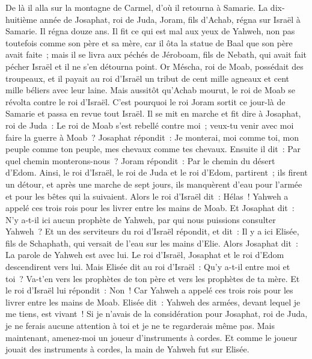 \begin{multicols}{2}
De là il alla sur la montagne de Carmel, d'où il retourna à Samarie.
\VerseOne{}La dix-huitième année de Josaphat, roi de Juda, Joram, fils d'Achab, régna sur Israël à Samarie. Il régna douze ans.
Il fit ce qui est mal aux yeux de Yahweh, non pas toutefois comme son père et sa mère, car il ôta la statue de Baal que son père avait faite~;
mais il se livra aux péchés de Jéroboam, fils de Nebath, qui avait fait pécher Israël et il ne s'en détourna point.
Or Méscha, roi de Moab, possédait des troupeaux, et il payait au roi d'Israël un tribut de cent mille agneaux et cent mille béliers avec leur laine.
Mais aussitôt qu'Achab mourut, le roi de Moab se révolta contre le roi d'Israël.
C'est pourquoi le roi Joram sortit ce jour-là de Samarie et passa en revue tout Israël.
Il se mit en marche et fit dire à Josaphat, roi de Juda~: Le roi de Moab s'est rebellé contre moi~; veux-tu venir avec moi faire la guerre à Moab~? Josaphat répondit~: Je monterai, moi comme toi, mon peuple comme ton peuple, mes chevaux comme tes chevaux.
Ensuite il dit~: Par quel chemin monterons-nous~? Joram répondit~: Par le chemin du désert d'Edom.
Ainsi, le roi d'Israël, le roi de Juda et le roi d'Edom, partirent~; ils firent un détour, et après une marche de sept jours, ils manquèrent d'eau pour l'armée et pour les bêtes qui la suivaient.
Alors le roi d'Israël dit~: Hélas~! Yahweh a appelé ces trois rois pour les livrer entre les mains de Moab.
Et Josaphat dit~: N'y a-t-il ici aucun prophète de Yahweh, par qui nous puissions consulter Yahweh~? Et un des serviteurs du roi d'Israël répondit, et dit~: Il y a ici Elisée, fils de Schaphath, qui versait de l'eau sur les mains d'Elie.
Alors Josaphat dit~: La parole de Yahweh est avec lui. Le roi d'Israël, Josaphat et le roi d'Edom descendirent vers lui.
Mais Elisée dit au roi d'Israël~: Qu'y a-t-il entre moi et toi~? Va-t'en vers les prophètes de ton père et vers les prophètes de ta mère. Et le roi d'Israël lui répondit~: Non~! Car Yahweh a appelé ces trois rois pour les livrer entre les mains de Moab.
Elisée dit~: Yahweh des armées, devant lequel je me tiens, est vivant~! Si je n'avais de la considération pour Josaphat, roi de Juda, je ne ferais aucune attention à toi et je ne te regarderais même pas.
Mais maintenant, amenez-moi un joueur d'instruments à cordes. Et comme le joueur jouait des instruments à cordes, la main de Yahweh fut sur Elisée.

\end{multicols}
